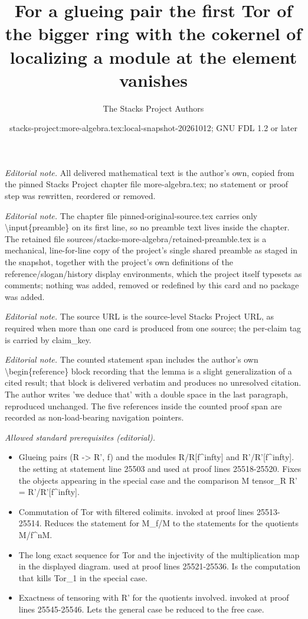 \documentclass[10pt,a4paper]{amsart}
\title{For a glueing pair the first Tor of the bigger ring with the cokernel of localizing a module at the element vanishes}
\author{The Stacks Project Authors}
\date{stacks-project:more-algebra.tex:local-snapshot-20261012; GNU FDL 1.2 or later}
\theoremstyle{plain}
\theoremstyle{definition}
\theoremstyle{remark}
\numberwithin{equation}{subsection}
\begin{document}
\maketitle
\setcounter{subsection}{1}
\noindent\textit{Editorial note.} All delivered mathematical text is the author's own, copied from the pinned Stacks Project chapter file more-algebra.tex; no statement or proof step was rewritten, reordered or removed.\par\medskip
\noindent\textit{Editorial note.} The chapter file pinned-original-source.tex carries only \textbackslash{}input\{preamble\} on its first line, so no preamble text lives inside the chapter. The retained file sources/stacks-more-algebra/retained-preamble.tex is a mechanical, line-for-line copy of the project's single shared preamble as staged in the snapshot, together with the project's own definitions of the reference/slogan/history display environments, which the project itself typesets as comments; nothing was added, removed or redefined by this card and no package was added.\par\medskip
\noindent\textit{Editorial note.} The source URL is the source-level Stacks Project URL, as required when more than one card is produced from one source; the per-claim tag is carried by claim\_key.\par\medskip
\noindent\textit{Editorial note.} The counted statement span includes the author's own \textbackslash{}begin\{reference\} block recording that the lemma is a slight generalization of a cited result; that block is delivered verbatim and produces no unresolved citation. The author writes 'we deduce  that' with a double space in the last paragraph, reproduced unchanged. The five references inside the counted proof span are recorded as non-load-bearing navigation pointers.\par\medskip
\noindent\textit{Allowed standard prerequisites (editorial).}\begin{itemize}
\item Glueing pairs (R -> R', f) and the modules R/R[f\textasciicircum{}infty] and R'/R'[f\textasciicircum{}infty]. the setting at statement line 25503 and used at proof lines 25518-25520. Fixes the objects appearing in the special case and the comparison M tensor\_R R' = R'/R'[f\textasciicircum{}infty].
\item Commutation of Tor with filtered colimits. invoked at proof lines 25513-25514. Reduces the statement for M\_f/M to the statements for the quotients M/f\textasciicircum{}nM.
\item The long exact sequence for Tor and the injectivity of the multiplication map in the displayed diagram. used at proof lines 25521-25536. Is the computation that kills Tor\_1 in the special case.
\item Exactness of tensoring with R' for the quotients involved. invoked at proof lines 25545-25546. Lets the general case be reduced to the free case.
\end{itemize}\medskip
\end{document}
